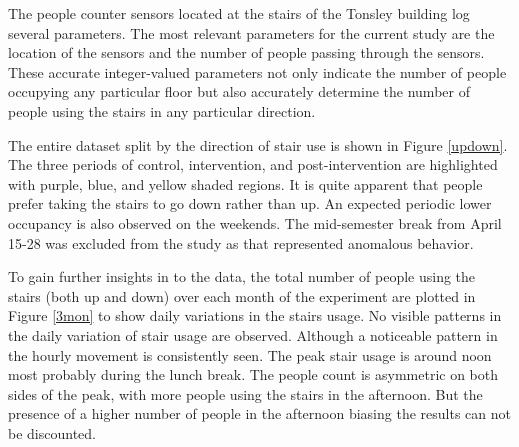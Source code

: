 The people counter sensors located at the stairs of the Tonsley building log several parameters. The most relevant parameters for the current study are the location of the sensors and the number of people passing through the sensors. These accurate integer-valued parameters not only indicate the number of people occupying any particular floor but also accurately determine the number of people using the stairs in any particular direction.

The entire dataset split by the direction of stair use is shown in Figure \ref{updown}. The three periods of control, intervention, and post-intervention are highlighted with purple, blue, and yellow shaded regions. It is quite apparent that people prefer taking the stairs to go down rather than up. An expected periodic lower occupancy is also observed on the weekends. The mid-semester break from April 15-28 was excluded from the study as that represented anomalous behavior.

To gain further insights in to the data, the total number of people using the stairs (both up and down) over each month of the experiment are plotted in Figure \ref{3mon} to show daily variations in the stairs usage. No visible patterns in the daily variation of stair usage are observed.  Although a noticeable pattern in the hourly movement is consistently seen. The peak stair usage is around noon most probably during the lunch break. The people count is asymmetric on both sides of the peak, with more people using the stairs in the afternoon. But the presence of a higher number of people in the afternoon biasing the results can not be discounted. %





